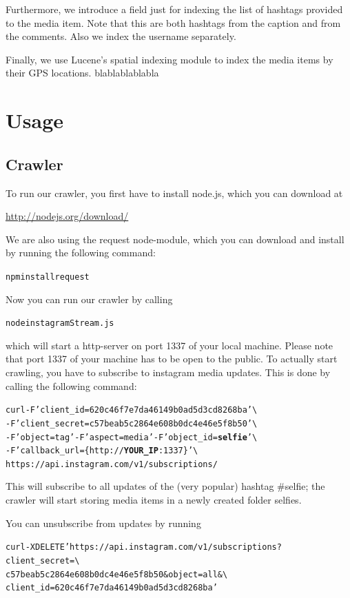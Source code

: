 \documentclass[11pt]{article}
\begin{document}
		Furthermore, we introduce a field just for indexing the list of hashtags provided to the media item. Note that this are both hashtags from the caption and from the comments. Also we index the username separately.

		Finally, we use Lucene's spatial indexing module to index the media items by their GPS locations.
		blablablablabla
\section{Usage}
	\subsection{Crawler}
		To run our crawler, you first have to install node.js, which you can download at 
		\begin{center}{\vspace{-3mm}\url{http://nodejs.org/download/}}\end{center}
		We are also using the request node-module, which you can download and install by running the following command:
		\begin{alltt}
			npm install request
		\end{alltt}
		Now you can run our crawler by calling
		\begin{alltt}
			node instagramStream.js
		\end{alltt}
		which will start a http-server on port 1337 of your local machine. Please note that port 1337 of your machine has to be open to the public. To actually start crawling, you have to subscribe to instagram media updates. This is done by calling the following command:
		\begin{alltt}
			curl -F 'client_id=620c46f7e7da46149b0ad5d3cd8268ba' \textbackslash 
			     -F 'client_secret=c57beab5c2864e608b0dc4e46e5f8b50' \textbackslash
			     -F 'object=tag' -F 'aspect=media' -F 'object_id=\textbf{selfie}' \textbackslash
			     -F 'callback_url=\{http://\textbf{YOUR_IP}:1337\}' \textbackslash
			     https://api.instagram.com/v1/subscriptions/
		\end{alltt}
		This will subscribe to all updates of the (very popular) hashtag $\#$selfie; the crawler will start storing media items in a newly created folder selfies.

		You can unsubscribe from updates by running
		\begin{alltt}
			curl -X DELETE 'https://api.instagram.com/v1/subscriptions?client_secret=\textbackslash
			     c57beab5c2864e608b0dc4e46e5f8b50&object=all&\textbackslash
			     client_id=620c46f7e7da46149b0ad5d3cd8268ba'
		\end{alltt}
\end{document}
